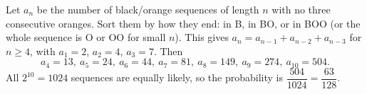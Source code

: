 Let $a_n$ be the number of black/orange sequences of length $n$ with no three consecutive oranges. Sort them by how they end: in B, in BO, or in BOO (or the whole sequence is O or OO for small $n$). This gives $a_n=a_{n-1}+a_{n-2}+a_{n-3}$ for $n\ge4$, with $a_1=2$, $a_2=4$, $a_3=7$. Then
\[
a_4=13,\ a_5=24,\ a_6=44,\ a_7=81,\ a_8=149,\ a_9=274,\ a_{10}=504 .
\]
All $2^{10}=1024$ sequences are equally likely, so the probability is $\dfrac{504}{1024}=\boxed{\dfrac{63}{128}}$.
